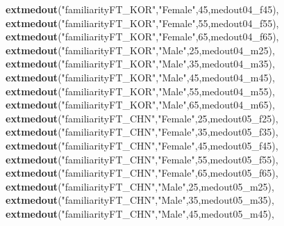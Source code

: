 \documentclass[
]{article}
\newenvironment{Shaded}{\begin{snugshade}}{\end{snugshade}}
\newcommand{\DecValTok}[1]{\textcolor[rgb]{0.00,0.00,0.81}{#1}}
\newcommand{\KeywordTok}[1]{\textcolor[rgb]{0.13,0.29,0.53}{\textbf{#1}}}
\newcommand{\NormalTok}[1]{#1}
\newcommand{\StringTok}[1]{\textcolor[rgb]{0.31,0.60,0.02}{#1}}
\begin{document}
\begin{Shaded}
\begin{Highlighting}[]
                  \KeywordTok{extmedout}\NormalTok{(}\StringTok{"familiarityFT_KOR"}\NormalTok{,}\StringTok{"Female"}\NormalTok{,}\DecValTok{45}\NormalTok{,medout04_f45),}
                  \KeywordTok{extmedout}\NormalTok{(}\StringTok{"familiarityFT_KOR"}\NormalTok{,}\StringTok{"Female"}\NormalTok{,}\DecValTok{55}\NormalTok{,medout04_f55),}
                  \KeywordTok{extmedout}\NormalTok{(}\StringTok{"familiarityFT_KOR"}\NormalTok{,}\StringTok{"Female"}\NormalTok{,}\DecValTok{65}\NormalTok{,medout04_f65),}
                  \KeywordTok{extmedout}\NormalTok{(}\StringTok{"familiarityFT_KOR"}\NormalTok{,}\StringTok{"Male"}\NormalTok{,}\DecValTok{25}\NormalTok{,medout04_m25),}
                  \KeywordTok{extmedout}\NormalTok{(}\StringTok{"familiarityFT_KOR"}\NormalTok{,}\StringTok{"Male"}\NormalTok{,}\DecValTok{35}\NormalTok{,medout04_m35),}
                  \KeywordTok{extmedout}\NormalTok{(}\StringTok{"familiarityFT_KOR"}\NormalTok{,}\StringTok{"Male"}\NormalTok{,}\DecValTok{45}\NormalTok{,medout04_m45),}
                  \KeywordTok{extmedout}\NormalTok{(}\StringTok{"familiarityFT_KOR"}\NormalTok{,}\StringTok{"Male"}\NormalTok{,}\DecValTok{55}\NormalTok{,medout04_m55),}
                  \KeywordTok{extmedout}\NormalTok{(}\StringTok{"familiarityFT_KOR"}\NormalTok{,}\StringTok{"Male"}\NormalTok{,}\DecValTok{65}\NormalTok{,medout04_m65),}
                  \KeywordTok{extmedout}\NormalTok{(}\StringTok{"familiarityFT_CHN"}\NormalTok{,}\StringTok{"Female"}\NormalTok{,}\DecValTok{25}\NormalTok{,medout05_f25),}
                  \KeywordTok{extmedout}\NormalTok{(}\StringTok{"familiarityFT_CHN"}\NormalTok{,}\StringTok{"Female"}\NormalTok{,}\DecValTok{35}\NormalTok{,medout05_f35),}
                  \KeywordTok{extmedout}\NormalTok{(}\StringTok{"familiarityFT_CHN"}\NormalTok{,}\StringTok{"Female"}\NormalTok{,}\DecValTok{45}\NormalTok{,medout05_f45),}
                  \KeywordTok{extmedout}\NormalTok{(}\StringTok{"familiarityFT_CHN"}\NormalTok{,}\StringTok{"Female"}\NormalTok{,}\DecValTok{55}\NormalTok{,medout05_f55),}
                  \KeywordTok{extmedout}\NormalTok{(}\StringTok{"familiarityFT_CHN"}\NormalTok{,}\StringTok{"Female"}\NormalTok{,}\DecValTok{65}\NormalTok{,medout05_f65),}
                  \KeywordTok{extmedout}\NormalTok{(}\StringTok{"familiarityFT_CHN"}\NormalTok{,}\StringTok{"Male"}\NormalTok{,}\DecValTok{25}\NormalTok{,medout05_m25),}
                  \KeywordTok{extmedout}\NormalTok{(}\StringTok{"familiarityFT_CHN"}\NormalTok{,}\StringTok{"Male"}\NormalTok{,}\DecValTok{35}\NormalTok{,medout05_m35),}
                  \KeywordTok{extmedout}\NormalTok{(}\StringTok{"familiarityFT_CHN"}\NormalTok{,}\StringTok{"Male"}\NormalTok{,}\DecValTok{45}\NormalTok{,medout05_m45),}

\end{Highlighting}
\end{Shaded}
\end{document}
